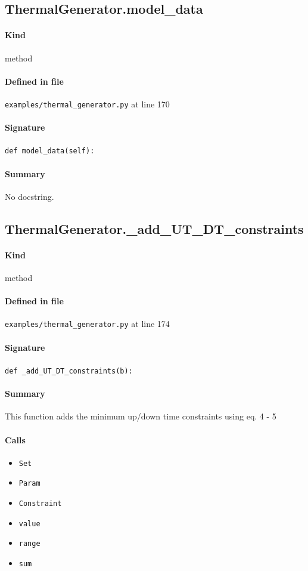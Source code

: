 \documentclass[11pt]{report}
\begin{document}
\subsection{ThermalGenerator.model\_data}
\label{def:examples-thermal_generator.py:ThermalGenerator.model_data:L170}
\paragraph{Kind} method
\paragraph{Defined in file} \texttt{examples/thermal\_generator.py} at line 170
\paragraph{Signature} \texttt{def model\_data(self):}
\paragraph{Summary} No docstring.
\subsection{ThermalGenerator.\_add\_UT\_DT\_constraints}
\label{def:examples-thermal_generator.py:ThermalGenerator._add_UT_DT_constraints:L174}
\paragraph{Kind} method
\paragraph{Defined in file} \texttt{examples/thermal\_generator.py} at line 174
\paragraph{Signature} \texttt{def \_add\_UT\_DT\_constraints(b):}
\paragraph{Summary} This function adds the minimum up/down time constraints using eq. 4 - 5
\paragraph{Calls}
\begin{itemize}[leftmargin=*]
  \item \texttt{Set}
  \item \texttt{Param}
  \item \texttt{Constraint}
  \item \texttt{value}
  \item \texttt{range}
  \item \texttt{sum}
\end{itemize}
\end{document}
